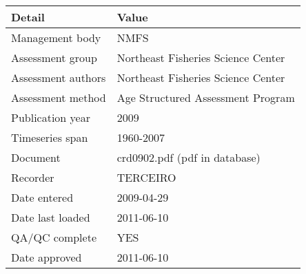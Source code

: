 \begin{table}[htb]
\centering
\begin{tabular}{lp{7cm}}
\toprule
Detail & Value \\
\midrule
Management body    & NMFS                               \\
Assessment group   & Northeast Fisheries Science Center \\
Assessment authors & Northeast Fisheries Science Center \\
Assessment method  & Age Structured Assessment Program  \\
Publication year   & 2009                               \\
Timeseries span    & 1960-2007                          \\
Document           & crd0902.pdf (pdf in database)      \\
Recorder           & TERCEIRO                           \\
Date entered       & 2009-04-29                         \\
Date last loaded   & 2011-06-10                         \\
QA/QC complete     & YES                                \\
Date approved      & 2011-06-10                         \\
\bottomrule
\end{tabular}
\label{tab:assessdet}
\end{table}

